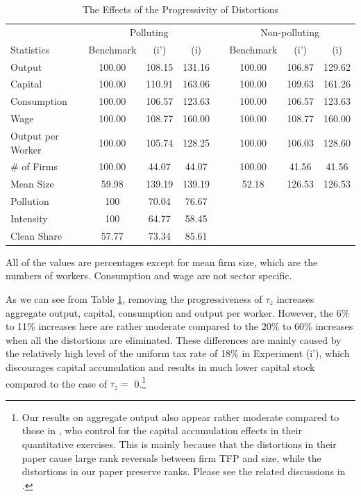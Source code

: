 \documentclass[AEJ]{AEA}
\begin{document}
\begin{table}[t]
\footnotesize
\centering
\caption{The Effects of the Progressivity of Distortions}
\begin{tabular}{lccccccc}
    \hline \hline
                         & \multicolumn{3}{c}{Polluting}    & & \multicolumn{3}{c}{Non-polluting} \\
    \cmidrule{2-4} \cmidrule{6-8}
    Statistics           & Benchmark & (i')      & (i)      & & Benchmark     & (i')    & (i) \\
    \hline
    Output               & 100.00    & 108.15   & 131.16    & & 100.00        & 106.87 & 129.62 \\
    Capital              & 100.00    & 110.91   & 163.06    & & 100.00        & 109.63 & 161.26 \\
    Consumption          & 100.00    & 106.57   & 123.63    & & 100.00        & 106.57 & 123.63 \\
    Wage                 & 100.00    & 108.77   & 160.00    & & 100.00        & 108.77 & 160.00 \\
    Output per Worker    & 100.00    & 105.74   & 128.25    & & 100.00        & 106.03 & 128.60 \\
    \hline
    \# of Firms          & 100.00    & 44.07    & 44.07     & & 100.00        & 41.56  & 41.56 \\
    Mean Size            & 59.98     & 139.19   & 139.19    & & 52.18         & 126.53 & 126.53 \\
    \hline
    Pollution            & 100       & 70.04    & 76.67     \\
    Intensity            & 100       & 64.77    & 58.45     \\
    Clean Share          & 57.77     & 73.34    & 85.61     \\
    \hline
\end{tabular}
\begin{tablenotes}
     All of the values are percentages except for mean firm size, which are the numbers of workers. Consumption and wage are not sector specific.
\end{tablenotes}
\label{tab:uniform}
\end{table}

As we can see from Table \ref{tab:uniform}, removing the progressiveness of $\tau_z$ increases aggregate output, capital, consumption and output per worker. However, the 6\% to 11\% increases here are rather moderate compared to the 20\% to 60\% increases when all the distortions are eliminated. These differences are mainly caused by the relatively high level of the uniform tax rate of 18\% in Experiment (i'), which discourages capital accumulation and results in much lower capital stock compared to the case of $\tau_z =$ 0.\footnote{Our results on aggregate output also appear rather moderate compared to those in \citet{RestucciaRogerson:2008}, who control for the capital accumulation effects in their quantitative exercises. This is mainly because that the distortions in their paper cause large rank reversals between firm TFP and size, while the distortions in our paper preserve ranks. Please see the related discussions in \citet{Hopenhayn:2014}.}
\end{document}
